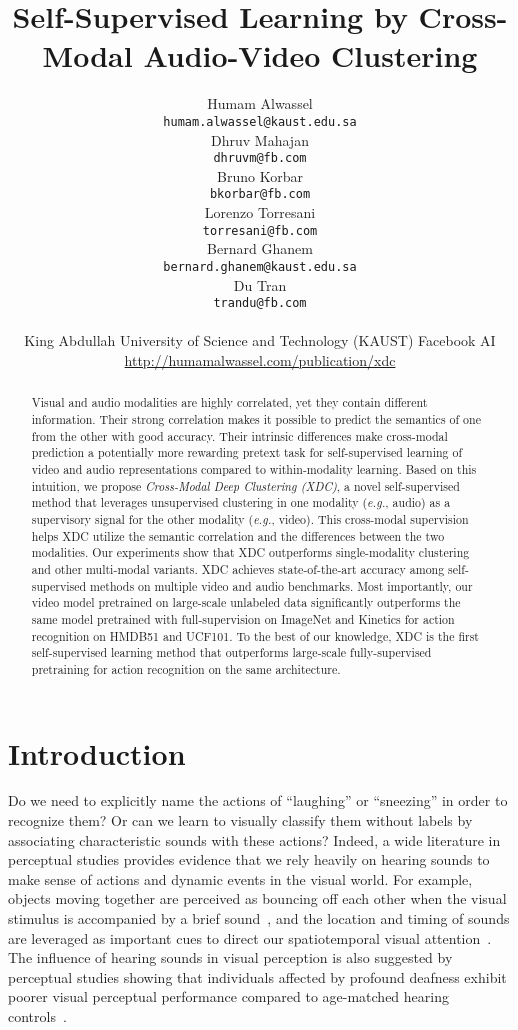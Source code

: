 \documentclass{article}
\title{Self-Supervised Learning by Cross-Modal Audio-Video Clustering}
\author{
Humam Alwassel \\
\texttt{\small humam.alwassel@kaust.edu.sa} \\ \And
Dhruv Mahajan \\
\texttt{\small dhruvm@fb.com} \\ \And
Bruno Korbar \\
\texttt{\small bkorbar@fb.com} \\ \AND
Lorenzo Torresani \\
\texttt{\small torresani@fb.com} \\ \And
Bernard Ghanem \\
\texttt{\small bernard.ghanem@kaust.edu.sa} \\ \And
Du Tran \\
\texttt{\small trandu@fb.com} \\ 
\AND \vspace{-16pt}
\\
King Abdullah University of Science and Technology (KAUST) \quad Facebook AI \\
{\url{http://humamalwassel.com/publication/xdc}}
}
\begin{document}
\maketitle

\begin{abstract}
Visual and audio modalities are highly correlated, yet they contain different information. Their strong correlation makes it possible to predict the semantics of one from the other with good accuracy. Their intrinsic differences make cross-modal prediction a potentially more rewarding pretext task for self-supervised learning of video and audio representations compared to within-modality learning. Based on this intuition, we propose \emph{Cross-Modal Deep Clustering (XDC)}, a novel self-supervised method that leverages unsupervised clustering in one modality (\emph{e.g.}, audio) as a supervisory signal for the other modality (\emph{e.g.}, video). This cross-modal supervision helps XDC utilize the semantic correlation and the differences between the two modalities. Our experiments show that XDC outperforms single-modality clustering and other multi-modal variants. XDC achieves state-of-the-art accuracy among self-supervised methods on multiple video and audio benchmarks. Most importantly, our video model pretrained on large-scale unlabeled data significantly outperforms the same model pretrained with full-supervision on ImageNet and Kinetics for action recognition on HMDB51 and UCF101. To the best of our knowledge, XDC is the first self-supervised learning method that outperforms large-scale fully-supervised pretraining for action recognition on the same architecture.
\end{abstract} \section{Introduction}\label{sec:intro}

Do we need to explicitly name the actions of ``laughing'' or ``sneezing'' in order to recognize them? Or can we learn to visually classify them without labels by associating characteristic sounds with these actions? Indeed, a wide literature in perceptual studies provides evidence that we rely heavily on hearing sounds to make sense of actions and dynamic events in the visual world. For example, objects moving together are perceived as bouncing off each other when the visual stimulus is accompanied by a brief sound~\cite{crossmodal}, and the location and timing of sounds are leveraged as important cues to direct our spatiotemporal visual attention~\cite{Heffner1992,Naatanen1992}. The influence of hearing sounds in visual perception is also suggested by perceptual studies showing that individuals affected by profound deafness exhibit poorer visual perceptual performance compared to age-matched hearing controls~\cite{gentile1969academic,myklebust1960psychology}. 
\end{document}
